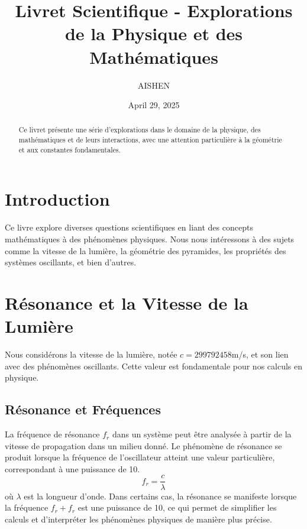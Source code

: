 \documentclass{article}
\begin{document}
\title{Livret Scientifique - Explorations de la Physique et des
Math{\'e}matiques}

\author{AISHEN}

\date{April 29, 2025}

\maketitle

\begin{abstract}
  Ce livret pr{\'e}sente une s{\'e}rie d'explorations dans le domaine de la
  physique, des math{\'e}matiques et de leurs interactions, avec une attention
  particuli{\`e}re {\`a} la g{\'e}om{\'e}trie et aux constantes fondamentales.
\end{abstract}

\section{Introduction}

Ce livre explore diverses questions scientifiques en liant des concepts
math{\'e}matiques {\`a} des ph{\'e}nom{\`e}nes physiques. Nous nous
int{\'e}ressons {\`a} des sujets comme la vitesse de la lumi{\`e}re, la
g{\'e}om{\'e}trie des pyramides, les propri{\'e}t{\'e}s des syst{\`e}mes
oscillants, et bien d'autres.

\section{R{\'e}sonance et la Vitesse de la Lumi{\`e}re}

Nous consid{\'e}rons la vitesse de la lumi{\`e}re, not{\'e}e $c =
299792458$m/s, et son lien avec des ph{\'e}nom{\`e}nes oscillants. Cette
valeur est fondamentale pour nos calculs en physique.

\subsection{R{\'e}sonance et Fr{\'e}quences}

La fr{\'e}quence de r{\'e}sonance $f_r$ dans un syst{\`e}me peut {\^e}tre
analys{\'e}e {\`a} partir de la vitesse de propagation dans un milieu
donn{\'e}. Le ph{\'e}nom{\`e}ne de r{\'e}sonance se produit lorsque la
fr{\'e}quence de l'oscillateur atteint une valeur particuli{\`e}re,
correspondant {\`a} une puissance de 10.
\[ f_r = \frac{c}{\lambda} \]
o{\`u} $\lambda$ est la longueur d'onde. Dans certains cas, la r{\'e}sonance
se manifeste lorsque la fr{\'e}quence $f_r + f_r$ est une puissance de 10, ce
qui permet de simplifier les calculs et d'interpr{\'e}ter les
ph{\'e}nom{\`e}nes physiques de mani{\`e}re plus pr{\'e}cise.
\end{document}
